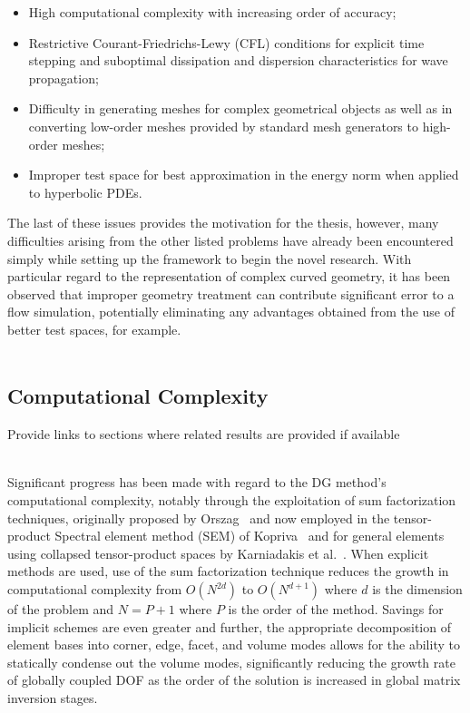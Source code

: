 \documentclass[12pt,Bold,letterpaper,TexShade]{mcgilletdclass}
\numberwithin{equation}{section}
\begin{document}
\begin{itemize}
\item High computational complexity with increasing order of accuracy;
\item Restrictive Courant-Friedrichs-Lewy (CFL) conditions for explicit time stepping and suboptimal dissipation and dispersion characteristics for wave propagation;
\item Difficulty in generating meshes for complex geometrical objects as well as in converting low-order meshes provided by standard mesh generators to high-order meshes;
\item Improper test space for best approximation in the energy norm when applied to hyperbolic PDEs. %
\end{itemize}

The last of these issues provides the motivation for the thesis, however, many difficulties arising from the other listed problems have already been encountered simply while setting up the framework to begin the novel research. With particular regard to the representation of complex curved geometry, it has been observed that improper geometry treatment can contribute significant error to a flow simulation, potentially eliminating any advantages obtained from the use of better test spaces, for example.
\\~

\subsection{Computational Complexity}
\label{sec:Comp_comp}
{\color{red} Provide links to sections where related results are provided if available}
\\~

Significant progress has been made with regard to the DG method's computational complexity, notably through the exploitation of sum factorization techniques, originally proposed by Orszag~\cite{orszag1980} and now employed in the tensor-product Spectral element method (SEM) of Kopriva~\cite{kopriva2009} and for general elements using collapsed tensor-product spaces by Karniadakis et al.~\cite{karniadakis1999}. When explicit methods are used, use of the sum factorization technique reduces the growth in computational complexity from $O(N^{2d})$ to $O(N^{d+1})$ where $d$ is the dimension of the problem and $N = P+1$ where $P$ is the order of the method. Savings for implicit schemes are even greater and further, the appropriate decomposition of element bases into corner, edge, facet, and volume modes allows for the ability to statically condense out the volume modes, significantly reducing the growth rate of globally coupled DOF as the order of the solution is increased in global matrix inversion stages. 
\\~
\end{document}
